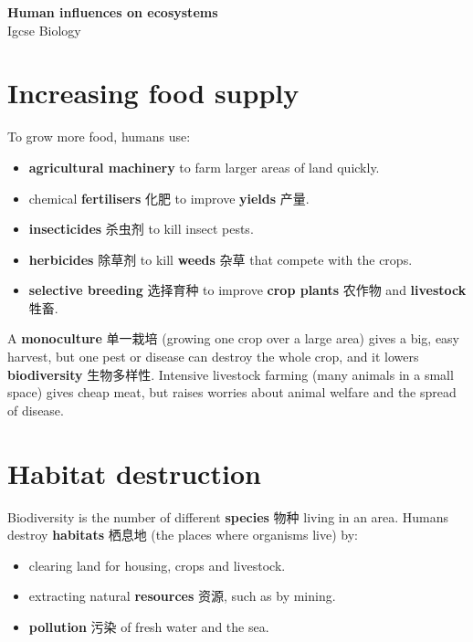\documentclass[11pt]{article}
\begin{document}
\begin{center}
  {\LARGE\bfseries Human influences on ecosystems}\\[0.35em]
  {\large Igcse Biology}
\end{center}
\vspace{0.6em}

\section*{Increasing food supply}

To grow more food, humans use:

\begin{itemize}
\item \textbf{agricultural machinery} to farm larger areas of land quickly.

\item chemical \textbf{fertilisers} 化肥 to improve \textbf{yields} 产量.

\item \textbf{insecticides} 杀虫剂 to kill insect pests.

\item \textbf{herbicides} 除草剂 to kill \textbf{weeds} 杂草 that compete with the crops.

\item \textbf{selective breeding} 选择育种 to improve \textbf{crop plants} 农作物 and \textbf{livestock} 牲畜.

\end{itemize}

A \textbf{monoculture} 单一栽培 (growing one crop over a large area) gives a big, easy harvest, but one pest or disease can destroy the whole crop, and it lowers \textbf{biodiversity} 生物多样性. Intensive livestock farming (many animals in a small space) gives cheap meat, but raises worries about animal welfare and the spread of disease.

\section*{Habitat destruction}

Biodiversity is the number of different \textbf{species} 物种 living in an area. Humans destroy \textbf{habitats} 栖息地 (the places where organisms live) by:

\begin{itemize}
\item clearing land for housing, crops and livestock.

\item extracting natural \textbf{resources} 资源, such as by mining.

\item \textbf{pollution} 污染 of fresh water and the sea.

\end{itemize}
\end{document}
